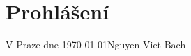 
\vspace*{\fill}
\section*{Prohlášení}
\lipsum[1]
\lipsum[2]
\vspace{2cm}
\begin{flushright}
\underline{\hspace{5cm}}
\end{flushright}
V Praze dne \today \hfill Nguyen Viet Bach
\newpage
